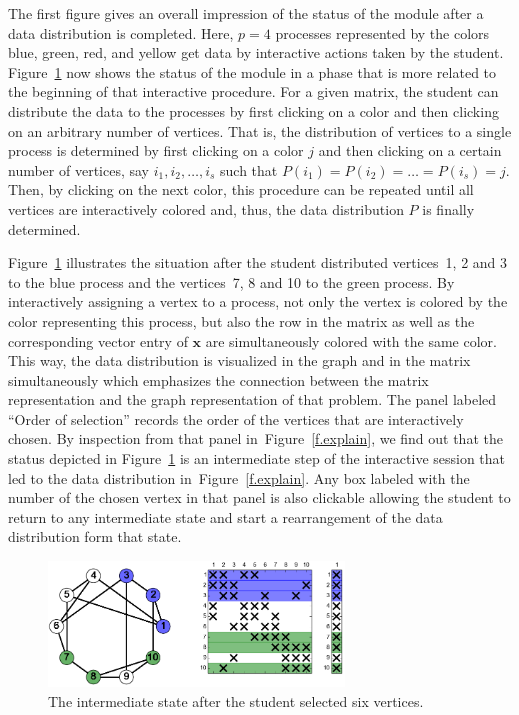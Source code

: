 \documentclass[12pt, oneside]{book}
\newcommand{\vek}[1]{{\ensuremath{\mathbf #1}}}
\newcommand{\figref}[1]{Figure~\protect\ref{#1}}
\begin{document}
The first figure gives an overall impression of the status of the module after a data
distribution is completed. Here, $p=4$ processes represented by the colors blue, green,
red, and yellow get data by interactive actions taken by the student.
Figure~\ref{f.beginning} now shows the status of the module in a phase that is more
related to the beginning of that interactive procedure. For a given matrix, the student
can distribute the data to the processes by first clicking on a color and then clicking
on an arbitrary number of vertices. That is, the distribution of vertices to a single
process is determined by first clicking on a color $j$ and then clicking on a certain
number of vertices, say $i_1, i_2, \dots, i_s$ such that $P(i_1) = P(i_2) = \dots =
P(i_s) = j$. Then, by clicking on the next color, this procedure can be repeated until
all vertices are interactively colored and, thus, the data distribution $P$ is finally
determined.

Figure~\ref{f.beginning} illustrates the situation after the student distributed
vertices~1, 2 and 3 to the blue process and the vertices~7, 8 and 10 to the green
process. By interactively assigning a vertex to a process, not only the vertex is colored
by the color representing this process, but also the row in the matrix as well as the
corresponding vector entry of \vek{x} are simultaneously colored with the same color.
This way, the data distribution is visualized in the graph and in the matrix
simultaneously which emphasizes the connection between the matrix representation and the
graph representation of that problem. The panel labeled ``Order of selection'' records
the order of the vertices that are interactively chosen. By inspection from that panel
in~\figref{f.explain}, we find out that the status depicted in \figref{f.beginning} is an
intermediate step of the interactive session that led to the data distribution
in~\figref{f.explain}. Any box labeled with the number of the chosen vertex in that panel
is also clickable allowing the student to return to any intermediate state and start a
rearrangement of the data distribution form that state.


\begin{figure}
\centering
\includegraphics[width=0.7\textwidth]{twoColors}
\caption{The intermediate state after the student selected six vertices.}
\label{f.beginning}
\end{figure}
\end{document}
